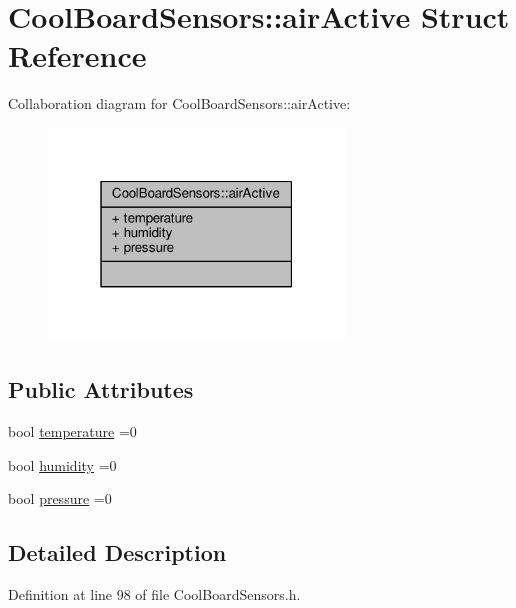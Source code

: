 \hypertarget{struct_cool_board_sensors_1_1air_active}{}\section{Cool\+Board\+Sensors\+:\+:air\+Active Struct Reference}
\label{struct_cool_board_sensors_1_1air_active}


Collaboration diagram for Cool\+Board\+Sensors\+:\+:air\+Active\+:\nopagebreak
\begin{figure}[H]
\begin{center}
\leavevmode
\includegraphics[width=223pt]{d5/d30/struct_cool_board_sensors_1_1air_active__coll__graph}
\end{center}
\end{figure}
\subsection*{Public Attributes}
\begin{DoxyCompactItemize}
\item 
bool \hyperlink{struct_cool_board_sensors_1_1air_active_ac08576736c7ac3bfbfec32e5ee17c686}{temperature} =0
\item 
bool \hyperlink{struct_cool_board_sensors_1_1air_active_ab69738e9fd1c2ba80dc666bcd1e116f7}{humidity} =0
\item 
bool \hyperlink{struct_cool_board_sensors_1_1air_active_a15932ccfb6ee6603713d937ec9b76b72}{pressure} =0
\end{DoxyCompactItemize}


\subsection{Detailed Description}


Definition at line 98 of file Cool\+Board\+Sensors.\+h.



